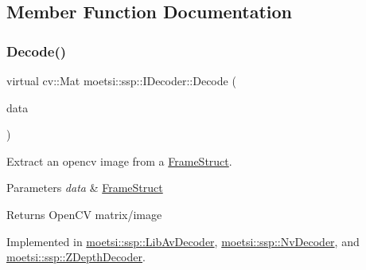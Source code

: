 \subsection{Member Function Documentation}
\mbox{\label{classmoetsi_1_1ssp_1_1IDecoder_a1c06604dc4107d3668a4e791c13cc063}} 
\subsubsection{\texorpdfstring{Decode()}{Decode()}\hspace{0.1cm}{\footnotesize\ttfamily [1/2]}}
{\footnotesize\ttfamily virtual cv\+::\+Mat moetsi\+::ssp\+::\+I\+Decoder\+::\+Decode (\begin{DoxyParamCaption}\item[{\hyperlink{structmoetsi_1_1ssp_1_1FrameStruct}{Frame\+Struct} \&}]{data }\end{DoxyParamCaption})\hspace{0.3cm}{\ttfamily [pure virtual]}}



Extract an opencv image from a \hyperlink{structmoetsi_1_1ssp_1_1FrameStruct}{Frame\+Struct}. 


\begin{DoxyParams}{Parameters}
{\em data} & \hyperlink{structmoetsi_1_1ssp_1_1FrameStruct}{Frame\+Struct} \\
\hline
\end{DoxyParams}
\begin{DoxyReturn}{Returns}
Open\+CV matrix/image 
\end{DoxyReturn}


Implemented in \hyperlink{classmoetsi_1_1ssp_1_1LibAvDecoder_a4206a4581de1b93d6c6a0835e8cf4ac8}{moetsi\+::ssp\+::\+Lib\+Av\+Decoder}, \hyperlink{classmoetsi_1_1ssp_1_1NvDecoder_a78eb894b6825ac5ec57f5a4f4ecd7e31}{moetsi\+::ssp\+::\+Nv\+Decoder}, and \hyperlink{classmoetsi_1_1ssp_1_1ZDepthDecoder_a43226095658d616f7e38df1d43c2f88a}{moetsi\+::ssp\+::\+Z\+Depth\+Decoder}.

\mbox{\label{classmoetsi_1_1ssp_1_1IDecoder_a1c06604dc4107d3668a4e791c13cc063}} 
